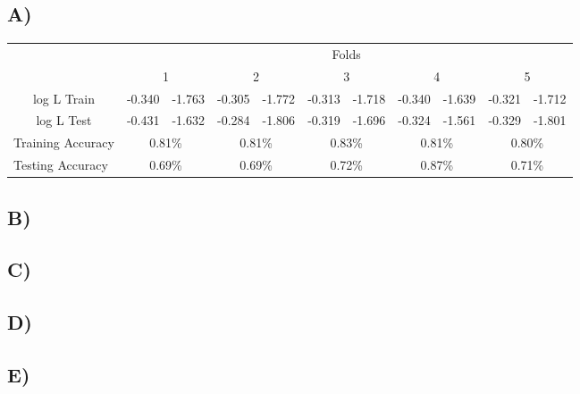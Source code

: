 \documentclass{report}
\begin{document}
\subsection*{A)}
\begin{center}
\begin{table}[h]
 \begin{tabular}{l|l|l|l|l|l|l|l|l|l|l|}
 \cline{2-11}
     & \multicolumn{10}{c|}{Folds}      \\ \cline{2-11}
     & \multicolumn{2}{c|}{1} & \multicolumn{2}{c|}{2} & \multicolumn{2}{c|}{3} & \multicolumn{2}{c|}{4} & \multicolumn{2}{c|}{5} \\ \hline
\multicolumn{1}{|c|}{log L Train} & -0.340 & -1.763 & -0.305 & -1.772 & -0.313 & -1.718 & -0.340 & -1.639 & -0.321 & -1.712 \\ \hline
\multicolumn{1}{|c|}{log L Test} & -0.431 & -1.632 & -0.284 & -1.806 & -0.319 & -1.696 & -0.324 & -1.561 & -0.329 & -1.801 \\ \hline
\multicolumn{1}{|l|}{Training Accuracy} & \multicolumn{2}{c|}{0.81\%} & \multicolumn{2}{c|}{0.81\%} & \multicolumn{2}{c|}{0.83\%} & \multicolumn{2}{c|}{0.81\%} & \multicolumn{2}{c|}{0.80\%} \\ \hline
\multicolumn{1}{|l|}{Testing Accuracy} & \multicolumn{2}{c|}{0.69\%} & \multicolumn{2}{c|}{0.69\%} & \multicolumn{2}{c|}{0.72\%} & \multicolumn{2}{c|}{0.87\%} & \multicolumn{2}{c|}{0.71\%} \\ \hline
\end{tabular}
\end{table}
\end{center}
\subsection*{B)}
\subsection*{C)}
\subsection*{D)}
\subsection*{E)}
\end{document}
